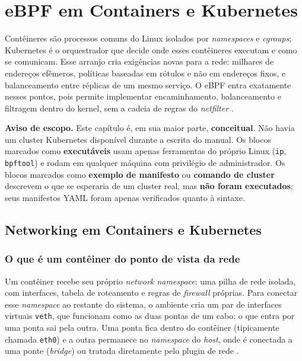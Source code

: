 \chapter{eBPF em Containers e Kubernetes}
\label{cap:k8s}

Contêineres são processos comuns do Linux isolados por \textit{namespaces} e
\textit{cgroups}; Kubernetes é o orquestrador que decide onde esses contêineres
executam e como se comunicam. Esse arranjo cria exigências novas para a rede: milhares
de endereços efêmeros, políticas baseadas em rótulos e não em endereços fixos, e
balanceamento entre réplicas de um mesmo serviço. O eBPF entra exatamente nesses
pontos, pois permite implementar encaminhamento, balanceamento e filtragem dentro do
kernel, sem a cadeia de regras do \textit{netfilter} \cite{linuxkernel2024, ciliumdocs}.

\textbf{Aviso de escopo.} Este capítulo é, em sua maior parte, \textbf{conceitual}. Não
havia um cluster Kubernetes disponível durante a escrita do manual. Os blocos marcados
como \textbf{executáveis} usam apenas ferramentas do próprio Linux (\texttt{ip},
\texttt{bpftool}) e rodam em qualquer máquina com privilégio de administrador. Os blocos
marcados como \textbf{exemplo de manifesto} ou \textbf{comando de cluster} descrevem o
que se esperaria de um cluster real, mas \textbf{não foram executados}; seus manifestos
YAML foram apenas verificados quanto à sintaxe.

\section{Networking em Containers e Kubernetes}

\subsection*{O que é um contêiner do ponto de vista da rede}

Um contêiner recebe seu próprio \textit{network namespace}: uma pilha de rede isolada,
com interfaces, tabela de roteamento e regras de \textit{firewall} próprias. Para
conectar esse \textit{namespace} ao restante do sistema, o ambiente cria um par de
interfaces virtuais \texttt{veth}, que funcionam como as duas pontas de um cabo: o que
entra por uma ponta sai pela outra. Uma ponta fica dentro do contêiner (tipicamente
chamada \texttt{eth0}) e a outra permanece no \textit{namespace} do \textit{host}, onde
é conectada a uma ponte (\textit{bridge}) ou tratada diretamente pelo plugin de rede
\cite{linuxkernel2024}.

